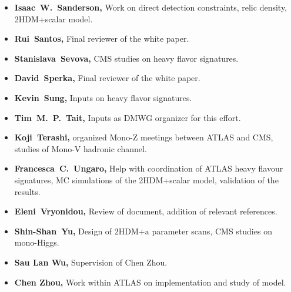 \documentclass[a4paper, 11pt,notoc]{article}
\newcommand{\hdma}{\ensuremath{\textrm{2HDM+a}}\xspace}
\begin{document}
\begin{itemize}
\item \textbf{Isaac~W.~Sanderson,}  Work on direct detection constraints, relic density, 2HDM+scalar model.

\item \textbf{Rui~Santos,}  Final reviewer of the white paper. 

\item \textbf{Stanislava~Sevova,} CMS studies on heavy flavor signatures. 

\item \textbf{David~Sperka,}  Final reviewer of the white paper. 

\item \textbf{Kevin~Sung,} Inputs on heavy flavor signatures. 

\item \textbf{Tim~M.~P.~Tait,} Inputs as DMWG organizer for this effort. 

\item \textbf{Koji~Terashi,} organized Mono-Z meetings between ATLAS and CMS, studies of Mono-V hadronic channel. 

\item \textbf{Francesca~C.~Ungaro,} Help with coordination of ATLAS heavy flavour signatures, MC simulations of the 2HDM+scalar model, validation of the results. 

\item \textbf{Eleni~Vryonidou,} Review of document, addition of relevant references.

\item \textbf{Shin-Shan~Yu,} Design of \hdma parameter scans, CMS studies on mono-Higgs.

\item \textbf{Sau Lan Wu,} Supervision of Chen Zhou.

\item \textbf{Chen Zhou,} Work within ATLAS on implementation and study of model.

\end{itemize}
\end{document}
